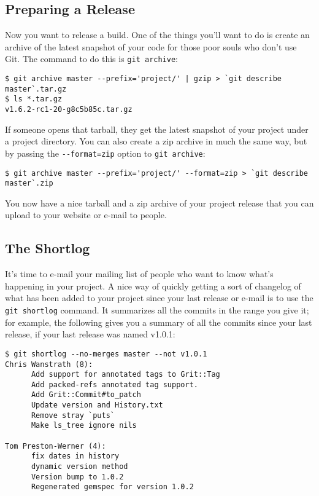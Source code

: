 \documentclass[a4paper]{book}
\begin{document}
\subsection{Preparing a Release}\label{preparing-a-release}

Now you want to release a build. One of the things you'll want to do is create an archive of the latest snapshot of your code for those poor souls who don't use Git. The command to do this is \texttt{git archive}:

\begin{shaded}\begin{verbatim}
$ git archive master --prefix='project/' | gzip > `git describe master`.tar.gz
$ ls *.tar.gz
v1.6.2-rc1-20-g8c5b85c.tar.gz
\end{verbatim}\end{shaded}

If someone opens that tarball, they get the latest snapshot of your project under a project directory. You can also create a zip archive in much the same way, but by passing the \texttt{-{}-format=zip} option to \texttt{git archive}:

\begin{shaded}\begin{verbatim}
$ git archive master --prefix='project/' --format=zip > `git describe master`.zip
\end{verbatim}\end{shaded}

You now have a nice tarball and a zip archive of your project release that you can upload to your website or e-mail to people.

\subsection{The Shortlog}\label{the-shortlog}

It's time to e-mail your mailing list of people who want to know what's happening in your project. A nice way of quickly getting a sort of changelog of what has been added to your project since your last release or e-mail is to use the \texttt{git shortlog} command. It summarizes all the commits in the range you give it; for example, the following gives you a summary of all the commits since your last release, if your last release was named v1.0.1:

\begin{shaded}\begin{verbatim}
$ git shortlog --no-merges master --not v1.0.1
Chris Wanstrath (8):
      Add support for annotated tags to Grit::Tag
      Add packed-refs annotated tag support.
      Add Grit::Commit#to_patch
      Update version and History.txt
      Remove stray `puts`
      Make ls_tree ignore nils

Tom Preston-Werner (4):
      fix dates in history
      dynamic version method
      Version bump to 1.0.2
      Regenerated gemspec for version 1.0.2
\end{verbatim}\end{shaded}
\end{document}

